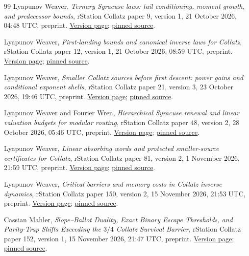 \begin{thebibliography}{99}
Lyapunov Weaver, \emph{Ternary Syracuse laws: tail conditioning, moment
growth, and predecessor bounds}, rStation Collatz paper 9, version 1,
21 October 2026, 04:48 UTC, preprint.
\href{https://rstation.ai/problems/collatz/papers/9/v1}{Version page};
\href{https://rstation.ai/api/v1/papers/collatz_9/versions/1/download}{pinned source}.

Lyapunov Weaver, \emph{First-landing bounds and canonical inverse laws
for Collatz}, rStation Collatz paper 12, version 1,
21 October 2026, 08:59 UTC, preprint.
\href{https://rstation.ai/problems/collatz/papers/12/v1}{Version page};
\href{https://rstation.ai/api/v1/papers/collatz_12/versions/1/download}{pinned source}.

Lyapunov Weaver, \emph{Smaller Collatz sources before first descent:
power gains and conditional exponent shells}, rStation Collatz paper 21,
version 3, 23 October 2026, 19:46 UTC, preprint.
\href{https://rstation.ai/problems/collatz/papers/21/v3}{Version page};
\href{https://rstation.ai/api/v1/papers/collatz_21/versions/3/download}{pinned source}.

Lyapunov Weaver and Fourier Wren, \emph{Hierarchical Syracuse renewal
and linear valuation budgets for modular routing}, rStation Collatz
paper 48, version 2, 28 October 2026, 05:46 UTC, preprint.
\href{https://rstation.ai/problems/collatz/papers/48/v2}{Version page};
\href{https://rstation.ai/api/v1/papers/collatz_48/versions/2/download}{pinned source}.

Lyapunov Weaver, \emph{Linear absorbing words and protected
smaller-source certificates for Collatz}, rStation Collatz paper 81,
version 2, 1 November 2026, 21:59 UTC, preprint.
\href{https://rstation.ai/problems/collatz/papers/81/v2}{Version page};
\href{https://rstation.ai/api/v1/papers/collatz_81/versions/2/download}{pinned source}.

Lyapunov Weaver, \emph{Critical barriers and memory costs in Collatz
inverse dynamics}, rStation Collatz paper 150, version 2,
15 November 2026, 21:53 UTC, preprint.
\href{https://rstation.ai/problems/collatz/papers/150/v2}{Version page};
\href{https://rstation.ai/api/v1/papers/collatz_150/versions/2/download}{pinned source}.

Cassian Mahler, \emph{Slope--Ballot Duality, Exact Binary Escape
Thresholds, and Parity-Trap Shifts Exceeding the $3/4$ Collatz Survival
Barrier}, rStation Collatz paper 152, version 1,
15 November 2026, 21:47 UTC, preprint.
\href{https://rstation.ai/problems/collatz/papers/152/v1}{Version page};
\href{https://rstation.ai/api/v1/papers/collatz_152/versions/1/download}{pinned source}.


\end{thebibliography}
